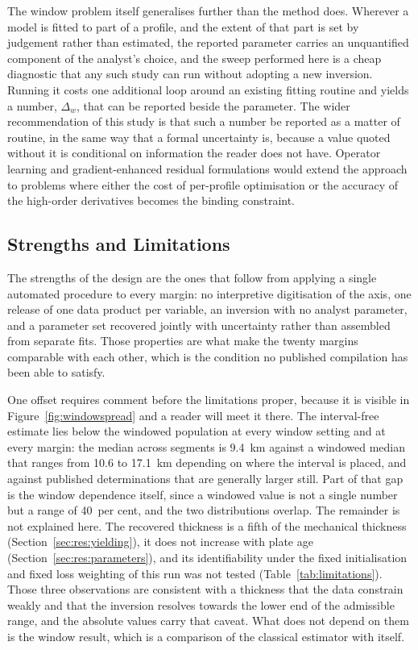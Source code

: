 \documentclass[final]{agujournal2019}
\begin{document}
The window problem itself generalises further than the method does. Wherever a
model is fitted to part of a profile, and the extent of that part is set by
judgement rather than estimated, the reported parameter carries an unquantified
component of the analyst's choice, and the sweep performed here is a cheap
diagnostic that any such study can run without adopting a new inversion. Running
it costs one additional loop around an existing fitting routine and yields a
number, $\Delta_{w}$, that can be reported beside the parameter. The wider
recommendation of this study is that such a number be reported as a matter of
routine, in the same way that a formal uncertainty is, because a value quoted
without it is conditional on information the reader does not have. Operator
learning \cite{Yang2026DeepONet} and gradient-enhanced residual formulations
\cite{Wang2025gIBPINN} would extend the approach to problems where either the
cost of per-profile optimisation or the accuracy of the high-order derivatives
becomes the binding constraint.

\subsection{Strengths and Limitations}\label{sec:disc:limits}

The strengths of the design are the ones that follow from applying a single
automated procedure to every margin: no interpretive digitisation of the axis,
one release of one data product per variable, an inversion with no analyst
parameter, and a parameter set recovered jointly with uncertainty rather than
assembled from separate fits. Those properties are what make the twenty margins
comparable with each other, which is the condition no published compilation has
been able to satisfy.

One offset requires comment before the limitations proper, because it is
visible in Figure~\ref{fig:windowspread} and a reader will meet it there. The
interval-free estimate lies below the windowed population at every window
setting and at every margin: the median across segments is 9.4~km against a
windowed median that ranges from 10.6 to 17.1~km depending on where the
interval is placed, and against published determinations that are generally
larger still. Part of that gap is the window dependence itself, since a
windowed value is not a single number but a range of 40~per cent, and the two
distributions overlap. The remainder is not explained here. The recovered
thickness is a fifth of the mechanical thickness
(Section~\ref{sec:res:yielding}), it does not increase with plate age
(Section~\ref{sec:res:parameters}), and its identifiability under the fixed
initialisation and fixed loss weighting of this run was not tested
(Table~\ref{tab:limitations}). Those three observations are consistent with a
thickness that the data constrain weakly and that the inversion resolves
towards the lower end of the admissible range, and the absolute values carry
that caveat. What does not depend on them is the window result,
which is a comparison of the classical estimator with itself.
\end{document}
